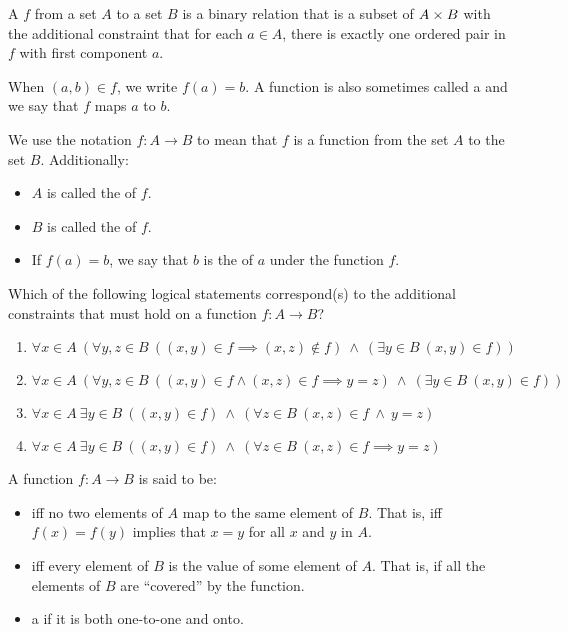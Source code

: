 \begin{defn}[Functions]
A  $f$ from a set $A$ to a set $B$ is a binary relation that is a subset of $A \times B$ with the additional constraint that for each $a \in A$, there is exactly one ordered pair in $f$ with first component $a$.

When $(a, b) \in f$, we write $f(a) = b$. A function is also sometimes called a  and we say that $f$ maps $a$ to $b$.

We use the notation $f : A \to B$ to mean that $f$ is a function from the set $A$ to the set $B$. Additionally:
\begin{itemize}
\item $A$ is called the  of $f$.
\item $B$ is called the  of $f$.
\item If $f(a) = b$, we say that $b$ is the  of $a$ under the function $f$.
\end{itemize}
\end{defn}

\begin{exer2}
Which of the following logical statements correspond(s) to the additional constraints that must hold on a function $f : A \to B$?
\begin{enumerate}[label=(\alph*)]
\item $\forall x \in A\ \left(        %
		\forall y, z \in B\ ((x, y) \in f \implies (x, z) \notin f) 
		\ \land\ (\exists y \in B\ (x, y) \in f )
		\right)$
\item $\forall x \in A\  \left(            %
		\forall y, z \in B\ ((x, y) \in f \wedge (x, z) \in f \implies y = z) 
		\ \land\ (\exists y \in B\ (x, y) \in f )
		\right)$
\item $\forall x \in A\ \exists y \in B\        %
		((x, y) \in f) \ \land\  (\forall z \in B\ (x, z) \in f \ \land\ y = z )  $
\item $\forall x \in A\ \exists y \in B\        %
		((x, y) \in f) \ \land\  (\forall z \in B\  (x, z) \in f \implies y = z )  $
\end{enumerate}
\end{exer2}

\begin{defn}
A function $f : A \to B$ is said to be:
\begin{itemize}
\item {} iff no two elements of $A$ map to the same element of $B$. That is, iff $f(x) = f(y)$ implies that $x = y$ for all $x$ and $y$ in $A$.
\item {} iff every element of $B$ is the value of some element of $A$. That is, if all the elements of $B$ are ``covered'' by the function. 
\item a  if it is both one-to-one and onto.
\end{itemize}
\end{defn}

